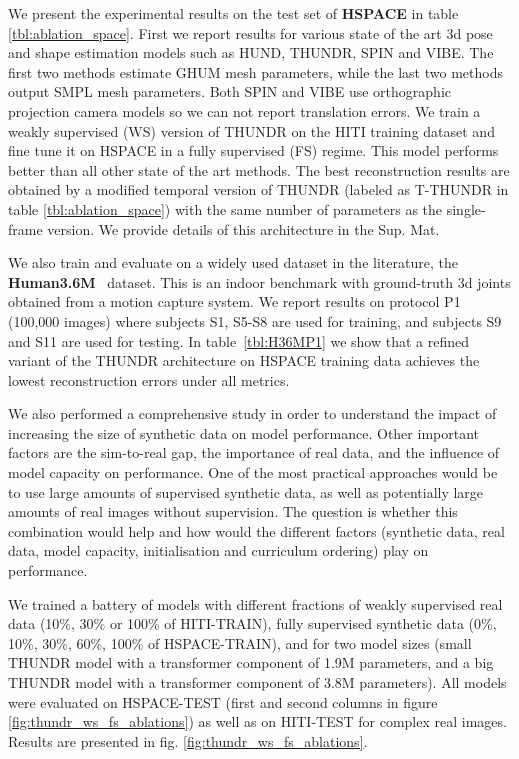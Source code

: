 \documentclass[10pt,twocolumn,letterpaper]{article}
\begin{document}
We present the experimental results on the test set of \textbf{HSPACE} in table \ref{tbl:ablation_space}. First we report results for various state of the art 3d pose and shape estimation models such as HUND\cite{zanfir2020neural}, THUNDR\cite{Zanfir_2021_ICCV}, SPIN\cite{kolotouros2019learning} and VIBE\cite{kocabas2019vibe}. The first two methods estimate GHUM mesh parameters, while the last two methods output SMPL mesh parameters. Both SPIN\cite{kolotouros2019learning} and VIBE\cite{kocabas2019vibe} use orthographic projection camera models so we can not report translation errors. We train a  weakly supervised (WS) version  of THUNDR on the HITI training dataset and fine tune it on HSPACE in a fully supervised (FS) regime. This model performs better than all other state of the art methods. The best reconstruction results are obtained by a modified temporal version of THUNDR (labeled as T-THUNDR in table \ref{tbl:ablation_space}) with the same number of parameters as the single-frame version. We provide details of this architecture in the Sup. Mat.

We also train and evaluate on a widely used dataset in the literature, the \textbf{Human3.6M}~\cite{Ionescu14pami} dataset. 
This is an indoor benchmark with ground-truth 3d joints obtained from a motion capture system. 
We report results on protocol P1 (100,000 images) where subjects S1, S5-S8 are used for training, and subjects S9 and S11 are used for testing. In table~\ref{tbl:H36MP1} we show that a refined variant of the THUNDR\cite{Zanfir_2021_ICCV} architecture on HSPACE training data  achieves the lowest reconstruction errors under all metrics. 

We also performed a comprehensive study in order to understand the impact of increasing the size of synthetic data on model performance. Other important factors are the sim-to-real gap, the importance of real data, and the influence of model capacity on performance. One of the most practical approaches would be to use large amounts of supervised synthetic data, as well as potentially large amounts of real images without supervision. The question is whether this combination would help and how would the different factors (synthetic data, real data, model capacity, initialisation and curriculum ordering) play on performance.

We trained a battery of models with different fractions of weakly supervised real data (10\%, 30\% or 100\% of HITI-TRAIN), fully supervised synthetic data (0\%, 10\%, 30\%, 60\%, 100\% of HSPACE-TRAIN), and for two model sizes (small THUNDR model with a transformer component of 1.9M parameters, and a big THUNDR model with a transformer component of 3.8M parameters). All models were evaluated on HSPACE-TEST (first and second columns in figure \ref{fig:thundr_ws_fs_ablations}) as well as on HITI-TEST for complex real images. Results are presented in fig. \ref{fig:thundr_ws_fs_ablations}. 
\end{document}
